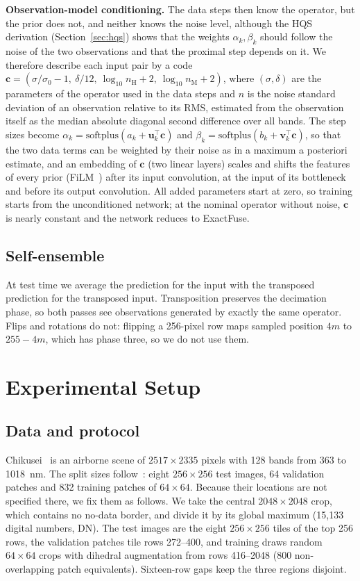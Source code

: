 \documentclass[journal]{IEEEtran}
\begin{document}
\textbf{Observation-model conditioning.} The data steps then know the operator, but the prior does not, and neither knows the noise level, although the HQS derivation (Section~\ref{sec:hqs}) shows that the weights $\alpha_k,\beta_k$ should follow the noise of the two observations and that the proximal step depends on it. We therefore describe each input pair by a code $\mathbf{c}=(\sigma/\sigma_0-1,\ \delta/12,\ \log_{10}n_{\mathrm{H}}+2,\ \log_{10}n_{\mathrm{M}}+2)$, where $(\sigma,\delta)$ are the parameters of the operator used in the data steps and $n$ is the noise standard deviation of an observation relative to its RMS, estimated from the observation itself as the median absolute diagonal second difference over all bands. The step sizes become $\alpha_k=\mathrm{softplus}(a_k+\mathbf{u}_k^{\top}\mathbf{c})$ and $\beta_k=\mathrm{softplus}(b_k+\mathbf{v}_k^{\top}\mathbf{c})$, so that the two data terms can be weighted by their noise as in a maximum a posteriori estimate, and an embedding of $\mathbf{c}$ (two linear layers) scales and shifts the features of every prior (FiLM~\cite{perez2018film}) after its input convolution, at the input of its bottleneck and before its output convolution. All added parameters start at zero, so training starts from the unconditioned network; at the nominal operator without noise, $\mathbf{c}$ is nearly constant and the network reduces to ExactFuse.

\subsection{Self-ensemble}
At test time we average the prediction for the input with the transposed prediction for the transposed input. Transposition preserves the decimation phase, so both passes see observations generated by exactly the same operator. Flips and rotations do not: flipping a 256-pixel row maps sampled position $4m$ to $255-4m$, which has phase three, so we do not use them.

\section{Experimental Setup}
\label{sec:setup}
\subsection{Data and protocol}
Chikusei~\cite{yokoya2016chikusei} is an airborne scene of $2517\times2335$ pixels with 128 bands from 363 to 1018~nm. The split sizes follow~\cite{chen2026twostage}: eight $256\times256$ test images, 64 validation patches and 832 training patches of $64\times64$. Because their locations are not specified there, we fix them as follows. We take the central $2048\times2048$ crop, which contains no no-data border, and divide it by its global maximum (15{,}133 digital numbers, DN). The test images are the eight $256\times256$ tiles of the top 256 rows, the validation patches tile rows 272--400, and training draws random $64\times64$ crops with dihedral augmentation from rows 416--2048 (800 non-overlapping patch equivalents). Sixteen-row gaps keep the three regions disjoint.
\end{document}
